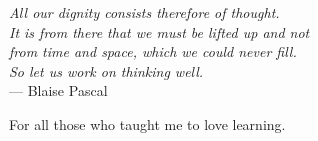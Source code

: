 \thispagestyle{empty}
{}

\vspace*{3cm}

\begin{center}
  \textit{
  All our dignity consists therefore of thought.\\
  It is from there that we must be lifted up and not\\
  from time and space, which we could never fill.\\
  So let us work on thinking well.} \\ \medskip
    --- Blaise Pascal
\end{center}

\medskip

\begin{center}
    For all those who taught me to love learning. \\ \smallskip
\end{center}
